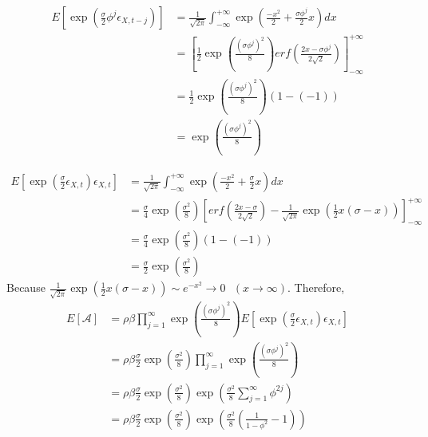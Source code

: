 \documentclass[11pt,a4,twosided,singlespacing,titlepagenumber=on]{scrreprt}
\numberwithin{equation}{chapter} %
\theoremstyle{remark}
\begin{document}
\begin{align*}
E\left[\exp \left( \frac{\sigma}{2} \phi^j \epsilon_{X, t-j} \right) \right] &= \frac{1}{\sqrt{2\pi}} \int^{+\infty}_{-\infty} \exp \left(\frac{-x^2}{2} + \frac{\sigma \phi^j}{2} x \right) dx \\
																			 &= \left[ \frac{1}{2} \exp \left(\frac{(\sigma\phi^j)^2}{8} \right) erf \left( \frac{2x- \sigma\phi^j}{2 \sqrt{2}} \right) \right]^{+\infty}_{-\infty} \\
																			 &= \frac{1}{2} \exp \left(\frac{(\sigma\phi^j)^2}{8} \right) (1 - (-1)) \\
																			 &= \exp \left(\frac{(\sigma\phi^j)^2}{8} \right)
\end{align*}



\begin{align*}
E\left[\exp \left( \frac{\sigma}{2} \epsilon_{X,t} \right) \epsilon_{X,t} \right] &= \frac{1}{\sqrt{2\pi}} \int^{+\infty}_{-\infty} \exp \left( \frac{-x^2}{2} + \frac{\sigma}{2} x \right) dx \\
																				  &= \frac{\sigma}{4} \exp \left(\frac{\sigma^2}{8}\right) \left[ erf \left(\frac{2x-\sigma}{2\sqrt{2}} \right) - \frac{1}{\sqrt{2\pi}}\exp \left(\frac{1}{2} x(\sigma-x) \right) \right]^{+\infty}_{-\infty} \\
																				  &= \frac{\sigma}{4} \exp \left(\frac{\sigma^2}{8}\right) (1 - (-1)) \\
																				  &= \frac{\sigma}{2} \exp \left(\frac{\sigma^2}{8}\right)
\end{align*}
Because $\frac{1}{\sqrt{2\pi}}\exp \left(\frac{1}{2} x(\sigma-x) \right) \sim e^{-x^2} \rightarrow 0 \text{ }(x \rightarrow \infty)$. Therefore, 
\begin{align*}
	E[\mathcal{A}] &= \rho \beta \prod_{j=1}^\infty \exp \left(\frac{(\sigma\phi^j)^2}{8} \right) E\left[\exp \left( \frac{\sigma}{2} \epsilon_{X,t} \right) \epsilon_{X,t} \right] \\
				   &= \rho \beta \frac{\sigma}{2} \exp \left(\frac{\sigma^2}{8}\right) \prod_{j=1}^\infty \exp \left(\frac{(\sigma\phi^j)^2}{8} \right) \\
				   &= \rho \beta \frac{\sigma}{2} \exp \left(\frac{\sigma^2}{8}\right) \exp \left( \frac{\sigma^2}{8} \sum_{j=1}^\infty \phi^{2j} \right) \\
				   &= \rho \beta \frac{\sigma}{2} \exp \left(\frac{\sigma^2}{8}\right) \exp \left( \frac{\sigma^2}{8} \left(\frac{1}{1-\phi^{2}} - 1\right)\right)
\end{align*}
\end{document}
